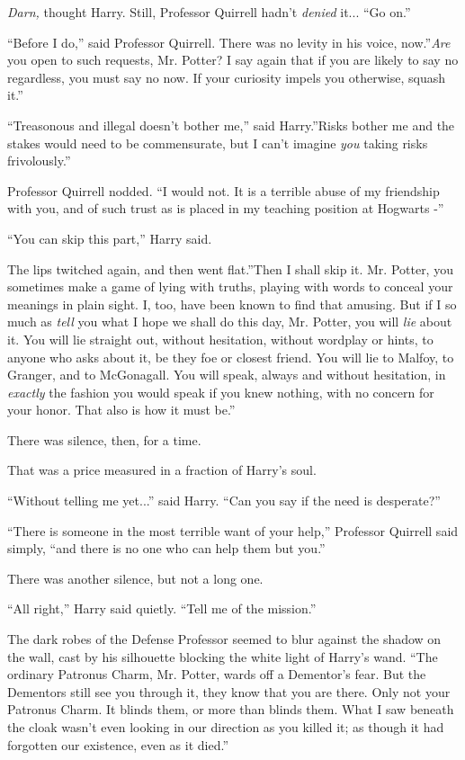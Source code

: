 \emph{Darn,} thought Harry. Still, Professor Quirrell hadn't
\emph{denied} it... ``Go on.''

``Before I do,'' said Professor Quirrell. There was no levity in his
voice, now.''\emph{Are} you open to such requests, Mr. Potter? I say
again that if you are likely to say no regardless, you must say no now.
If your curiosity impels you otherwise, squash it.''

``Treasonous and illegal doesn't bother me,'' said Harry.''Risks bother
me and the stakes would need to be commensurate, but I can't imagine
\emph{you} taking risks frivolously.''

Professor Quirrell nodded. ``I would not. It is a terrible abuse of my
friendship with you, and of such trust as is placed in my teaching
position at Hogwarts -''

``You can skip this part,'' Harry said.

The lips twitched again, and then went flat.''Then I shall skip it. Mr.
Potter, you sometimes make a game of lying with truths, playing with
words to conceal your meanings in plain sight. I, too, have been known
to find that amusing. But if I so much as \emph{tell} you what I hope we
shall do this day, Mr. Potter, you will \emph{lie} about it. You will
lie straight out, without hesitation, without wordplay or hints, to
anyone who asks about it, be they foe or closest friend. You will lie to
Malfoy, to Granger, and to McGonagall. You will speak, always and
without hesitation, in \emph{exactly} the fashion you would speak if you
knew nothing, with no concern for your honor. That also is how it must
be.''

There was silence, then, for a time.

That was a price measured in a fraction of Harry's soul.

``Without telling me yet...'' said Harry. ``Can you say if the need
is desperate?''

``There is someone in the most terrible want of your help,'' Professor
Quirrell said simply, ``and there is no one who can help them but you.''

There was another silence, but not a long one.

``All right,'' Harry said quietly. ``Tell me of the mission.''

The dark robes of the Defense Professor seemed to blur against the
shadow on the wall, cast by his silhouette blocking the white light of
Harry's wand. ``The ordinary Patronus Charm, Mr. Potter, wards off a
Dementor's fear. But the Dementors still see you through it, they know
that you are there. Only not your Patronus Charm. It blinds them, or
more than blinds them. What I saw beneath the cloak wasn't even looking
in our direction as you killed it; as though it had forgotten our
existence, even as it died.''


